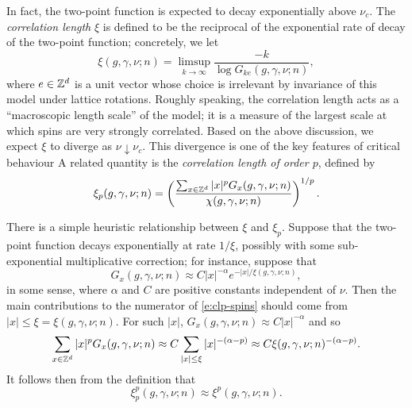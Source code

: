 In fact, the two-point function is expected to decay exponentially above $\nu_c$.
The \emph{correlation length} $\xi$ is defined to be the reciprocal of the exponential
rate of decay of the two-point function; concretely, we let
\begin{equation}
\label{e:cl-spins}
\xi(g, \gamma, \nu; n) = \limsup_{k\to\infty} \frac{-k}{\log G_{ke}(g, \gamma, \nu; n)},
\end{equation}
where $e \in { {{\mathbb Z}}^d }$ is a unit vector whose choice is irrelevant by invariance of this model
under lattice rotations.
Roughly speaking, the correlation length acts as
a ``macroscopic length scale'' of the model; it is a measure of the largest scale at
which spins are very strongly correlated. Based on the above discussion, we expect $\xi$
to diverge as $\nu\downarrow\nu_c$. This divergence is one of the
key features of critical behaviour
A related quantity is the \emph{correlation length of order $p$}, defined by
\begin{equation}
\label{e:clp-spins}
\xi_p(g, \gamma, \nu; n)
	=
\left(\frac{\sum_{x\in{ {{\mathbb Z}}^d }} |x|^p G_x(g, \gamma, \nu; n)}{\chi(g, \gamma, \nu; n)}\right)^{1/p}.
\end{equation}

\begin{rk}
There is a simple heuristic relationship between $\xi$ and $\xi_p$. Suppose that
the two-point function decays exponentially at rate $1/\xi$, possibly with some
sub-exponential multiplicative correction; for instance, suppose that
\begin{equation}
G_x(g, \gamma, \nu; n) \approx C |x|^{-\alpha} e^{-|x|/\xi(g, \gamma, \nu; n)},
\end{equation}
in some sense, where $\alpha$ and $C$ are positive constants independent of $\nu$.
Then the main contributions to the numerator of
\eqref{e:clp-spins} should come from $|x| \le \xi = \xi(g, \gamma, \nu; n)$. For such $|x|$,
$G_x(g, \gamma, \nu; n) \approx C |x|^{-\alpha}$ and so
\begin{equation}
\sum_{x\in{ {{\mathbb Z}}^d }} |x|^p G_x(g, \gamma, \nu; n)
	\approx
C \sum_{|x| \le \xi} |x|^{-(\alpha-p)}
	\approx
C \xi(g, \gamma, \nu; n)^{-(\alpha-p)}.
\end{equation}
It follows then from the definition that
\begin{equation}
\xi^p_p(g, \gamma, \nu; n) \approx \xi^p(g, \gamma, \nu; n).
\end{equation}
\end{rk}

